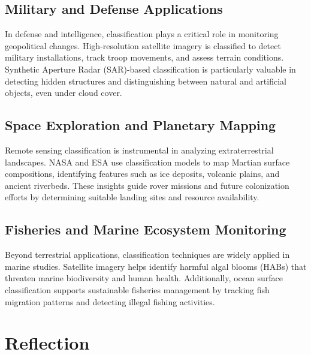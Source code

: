 \documentclass[
  letterpaper,
]{scrbook}
\begin{document}
\subsection{\texorpdfstring{\textbf{Military and Defense
Applications}}{Military and Defense Applications}}\label{military-and-defense-applications}

In defense and intelligence, classification plays a critical role in
monitoring geopolitical changes. High-resolution satellite imagery is
classified to detect military installations, track troop movements, and
assess terrain conditions. Synthetic Aperture Radar (SAR)-based
classification is particularly valuable in detecting hidden structures
and distinguishing between natural and artificial objects, even under
cloud cover.

\subsection{\texorpdfstring{\textbf{Space Exploration and Planetary
Mapping}}{Space Exploration and Planetary Mapping}}\label{space-exploration-and-planetary-mapping}

Remote sensing classification is instrumental in analyzing
extraterrestrial landscapes. NASA and ESA use classification models to
map Martian surface compositions, identifying features such as ice
deposits, volcanic plains, and ancient riverbeds. These insights guide
rover missions and future colonization efforts by determining suitable
landing sites and resource availability.

\subsection{\texorpdfstring{\textbf{Fisheries and Marine Ecosystem
Monitoring}}{Fisheries and Marine Ecosystem Monitoring}}\label{fisheries-and-marine-ecosystem-monitoring}

Beyond terrestrial applications, classification techniques are widely
applied in marine studies. Satellite imagery helps identify harmful
algal blooms (HABs) that threaten marine biodiversity and human health.
Additionally, ocean surface classification supports sustainable
fisheries management by tracking fish migration patterns and detecting
illegal fishing activities.

\section{Reflection}\label{reflection-5}
\end{document}
